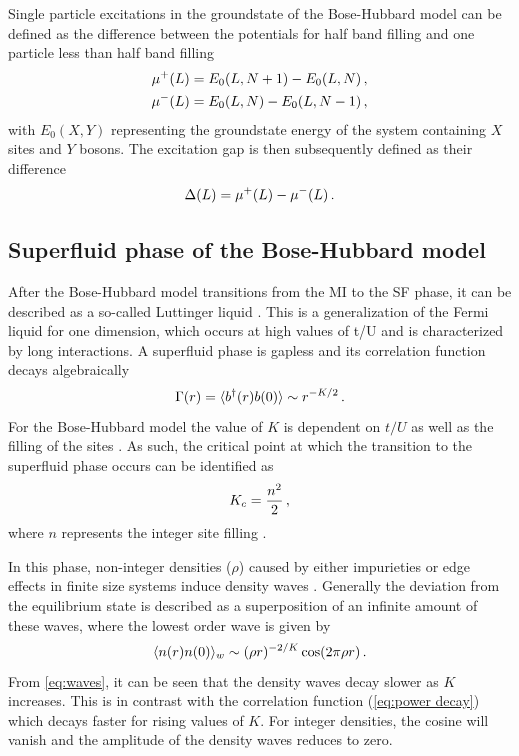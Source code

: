 \documentclass[twoside,twocolumn,9pt]{article}
\begin{document}
Single particle excitations in the groundstate of the Bose-Hubbard model can be defined as the difference between the potentials for half band filling and one particle less than half band filling
\begin{align}
  \mu^+(L) &= E_0(L, N+1) - E_0(L, N) \thinspace ,\\
  \mu^-(L) &= E_0(L, N) - E_0(L, N-1) \thinspace ,
\end{align}
with $E_0(X, Y)$ representing the groundstate energy of the system containing $X$ sites and $Y$ bosons. The excitation gap is then subsequently defined as their difference
\begin{equation}
  \Delta(L) = \mu^+(L) - \mu^-(L) \thinspace .
  \label{eq:gap}
\end{equation}

\subsection{Superfluid phase of the Bose-Hubbard model}
After the Bose-Hubbard model transitions from the MI to the SF phase, it can be described as a so-called Luttinger liquid \cite{PhysRevB.46.9325}. This is a generalization of the Fermi liquid for one dimension, which occurs at high values of t/U and is characterized by long interactions. A superfluid phase is gapless and its correlation function decays algebraically
\begin{equation}
    \Gamma(r) = \langle b^\dagger(r)b(0)\rangle \sim r^{-K/2} \thinspace .
    \label{eq:power decay}
\end{equation}
For the Bose-Hubbard model the value of $K$ is dependent on $t/U$ as well as the filling of the sites \cite{schulz1995fermi}. As such, the critical point at which the transition to the superfluid phase occurs can be identified as
\begin{equation}
    K_c = \frac{n^2}{2} \thinspace ,
    \label{eq:Kc}
\end{equation}
where $n$ represents the integer site filling \cite{PhysRevB.46.9325}.

In this phase, non-integer densities ($\rho$) caused by either impurieties or edge effects in finite size systems induce density waves \cite{PhysRevLett.47.1840}. Generally the deviation from the equilibrium state is described as a superposition of an infinite amount of these waves, where the lowest order wave is given by 
\begin{equation}
    \langle n(r)n(0) \rangle_w \sim (\rho r)^{-2/K} \cos(2\pi\rho r) \thinspace .
    \label{eq:waves}
\end{equation}
From \cref{eq:waves}, it can be seen that the density waves decay slower as $K$ increases. This is in contrast with the correlation function (\cref{eq:power decay}) which decays faster for rising values of $K$. For integer densities, the cosine will vanish and the amplitude of the density waves reduces to zero.
\end{document}
